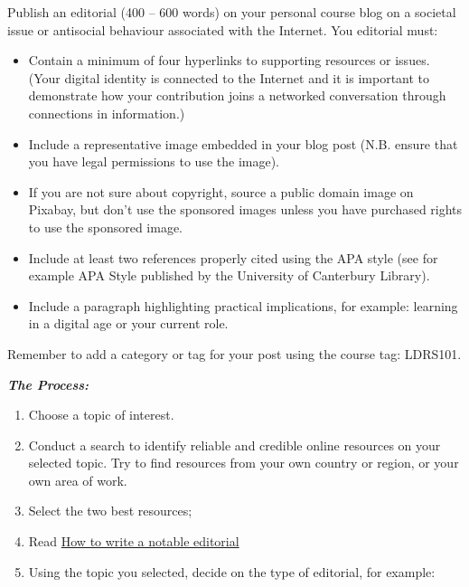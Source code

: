 \documentclass[
]{book}
\providecommand{\tightlist}{%
  \setlength{\itemsep}{0pt}\setlength{\parskip}{0pt}}
\theoremstyle{definition}
\theoremstyle{definition}
\theoremstyle{definition}
\theoremstyle{definition}
\theoremstyle{remark}
\begin{document}
\begin{reflect}
Publish an editorial (400 -- 600 words) on your personal course blog on a societal issue or antisocial behaviour associated with the Internet. You editorial must:

\begin{itemize}
\tightlist
\item
  Contain a minimum of four hyperlinks to supporting resources or issues. (Your digital identity is connected to the Internet and it is important to demonstrate how your contribution joins a networked conversation through connections in information.)\\
\item
  Include a representative image embedded in your blog post (N.B. ensure that you have legal permissions to use the image).\\
\item
  If you are not sure about copyright, source a public domain image on Pixabay, but don't use the sponsored images unless you have purchased rights to use the sponsored image.\\
\item
  Include at least two references properly cited using the APA style (see for example APA Style published by the University of Canterbury Library).\\
\item
  Include a paragraph highlighting practical implications, for example: learning in a digital age or your current role.
\end{itemize}

Remember to add a category or tag for your post using the course tag: LDRS101.

\textbf{\emph{The Process:}}

\begin{enumerate}
\def\labelenumi{\arabic{enumi}.}
\tightlist
\item
  Choose a topic of interest.\\
\item
  Conduct a search to identify reliable and credible online resources on your selected topic. Try to find resources from your own country or region, or your own area of work.\\
\item
  Select the two best resources;\\
\item
  Read \href{https://www.wikihow.com/Write-a-Notable-Editorial}{How to write a notable editorial}\\
\item
  Using the topic you selected, decide on the type of editorial, for example:\\
\end{enumerate}


\end{reflect}
\end{document}
